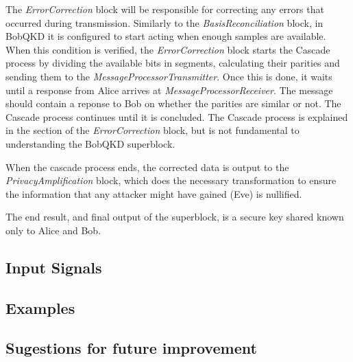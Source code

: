 The \textit{ErrorCorrection} block will be responsible for correcting any 
errors that occurred during transmission. Similarly to the 
\textit{BasisReconciliation} block, in BobQKD it is configured to start acting 
when enough samples are available. When this condition is verified, the 
\textit{ErrorCorrection} block starts the Cascade process by dividing the 
available bits in segments, calculating their parities and sending them to the 
\textit{MessageProcessorTransmitter}. Once this is done, it waits until a 
response from Alice arrives at \textit{MessageProcessorReceiver}. The message 
should contain a reponse to Bob on whether the parities are similar or not. The 
Cascade process continues until it is concluded. The Cascade process is 
explained in the section of the \textit{ErrorCorrection} block, but is not 
fundamental to understanding the BobQKD superblock.

When the cascade process ends, the corrected data is output to the 
\textit{PrivacyAmplification} block, which does the necessary transformation to 
ensure the information that any attacker might have gained (Eve) is nullified.

The end result, and final output of the superblock, is a secure key 
shared known only to Alice and Bob.

\subsection*{Input Signals}


\subsection*{Examples}


\subsection*{Sugestions for future improvement} 